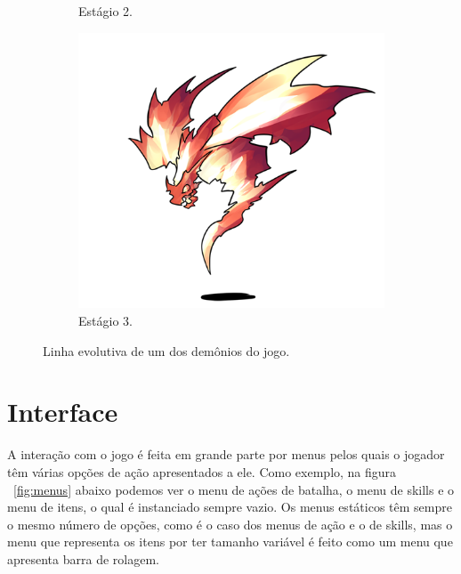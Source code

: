 \documentclass[
	12pt,				%
	openright,			%
	twoside,			%
	a4paper,			%
	english,			%
	french,				%
	spanish,			%
	brazil				%
	]{abntex2}
\begin{document}
\begin{figure}[h!]
\begin{subfigure}[b]{0.3\linewidth}
    \caption{Estágio 2.}
  \end{subfigure}
  \begin{subfigure}[b]{0.45\linewidth}
    \includegraphics[width=\linewidth]{stage3.png}
    \caption{Estágio 3.}
  \end{subfigure}
  \caption{Linha evolutiva de um dos demônios do jogo.}
  \label{fig:evolution}
\end{figure}

\section{Interface}

A interação com o jogo é feita em grande parte por menus pelos quais o jogador têm várias opções de ação apresentados a ele. Como exemplo, na figura ~\ref{fig:menus} abaixo podemos ver o menu de ações de batalha, o menu de skills e o menu de itens, o qual é instanciado sempre vazio. Os menus estáticos têm sempre o mesmo número de opções, como é o caso dos menus de ação e o de skills, mas o menu que representa os itens por ter tamanho variável é feito como um menu que apresenta barra de rolagem.
\end{document}
